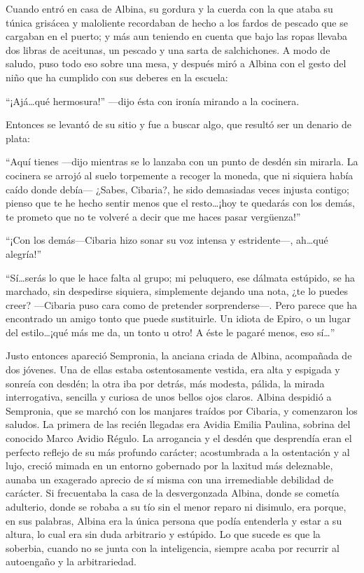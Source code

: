 \documentclass[11pt,openany]{book}
\begin{document}
Cuando entró en casa de Albina, su gordura y la cuerda con la que ataba su túnica grisácea y maloliente recordaban de hecho a los fardos de pescado que se cargaban en el puerto; y más aun teniendo en cuenta que bajo las ropas llevaba dos libras de aceitunas, un pescado y una sarta de salchichones. A modo de saludo, puso todo eso sobre una mesa, y después miró a Albina con el gesto del niño que ha cumplido con sus deberes en la escuela: 

“¡Ajá\dots qué hermosura!” —dijo ésta con ironía mirando a la cocinera. 

Entonces se levantó de su sitio y fue a buscar algo, que resultó ser un denario de plata: 

“Aquí tienes —dijo mientras se lo lanzaba con un punto de desdén sin mirarla. La cocinera se arrojó al suelo torpemente a recoger la moneda, que ni siquiera había caído donde debía— ¿Sabes, Cibaria?, he sido demasiadas veces injusta contigo; pienso que te he hecho sentir menos que el resto\dots ¡hoy te quedarás con los demás, te prometo que no te volveré a decir que me haces pasar vergüenza!” 

“¡Con los demás—Cibaria hizo sonar su voz intensa y estridente—, ah\dots qué alegría!” 

“Sí\dots serás lo que le hace falta al grupo; mi peluquero, ese dálmata estúpido, se ha marchado, sin despedirse siquiera, simplemente dejando una nota, ¿te lo puedes creer? —Cibaria puso cara como de pretender sorprenderse—. Pero parece que ha encontrado un amigo tonto que puede sustituirle. Un idiota de Epiro, o un lugar del estilo\dots ¡qué más me da, un tonto u otro! A éste le pagaré menos, eso sí\dots”

Justo entonces apareció Sempronia, la anciana criada de Albina, acompañada de dos jóvenes. Una de ellas estaba ostentosamente vestida, era alta y espigada y sonreía con desdén; la otra iba por detrás, más modesta, pálida, la mirada interrogativa, sencilla y curiosa de unos bellos ojos claros. Albina despidió a Sempronia, que se marchó con los manjares traídos por Cibaria, y comenzaron los saludos. La primera de las recién llegadas era Avidia Emilia Paulina, sobrina del conocido Marco Avidio Régulo. La arrogancia y el desdén que desprendía eran el perfecto reflejo de su más profundo carácter; acostumbrada a la ostentación y al lujo, creció mimada en un entorno gobernado por la laxitud más deleznable, aunaba un exagerado aprecio de sí misma con una irremediable debilidad de carácter. Si frecuentaba la casa de la desvergonzada Albina, donde se cometía adulterio, donde se robaba a su tío sin el menor reparo ni disimulo, era porque, en sus palabras, Albina era la única persona que podía entenderla y estar a su altura, lo cual era sin duda arbitrario y estúpido. Lo que sucede es que la soberbia, cuando no se junta con la inteligencia, siempre acaba por recurrir al autoengaño y la arbitrariedad. 
\end{document}

